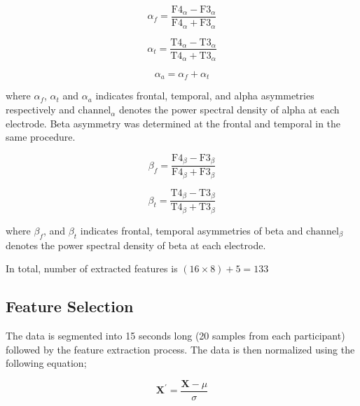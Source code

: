 \documentclass[pdflatex,sn-mathphys]{sn-jnl}%
\theoremstyle{thmstyleone}%
\theoremstyle{thmstyletwo}%
\theoremstyle{thmstylethree}%
\begin{document}
\begin{equation} \label{eq:3}
   \alpha_{f} =\frac{ \text{F4}_{\alpha} - \text{F3}_{\alpha} }{ \text{F4}_{\alpha} + \text{F3}_{\alpha} }
\end{equation}

\begin{equation} \label{eq:4}
    \alpha_{t} =\frac{ \text{T4}_{\alpha} - \text{T3}_{\alpha} }{ \text{T4}_{\alpha} + \text{T3}_{\alpha} }
\end{equation}

\begin{equation} \label{eq:5}
   \alpha_{a} ={\alpha_{f}+\alpha_{t}}
\end{equation}

where $\alpha_{f}$, $\alpha_{t}$ and $\alpha_{a}$ indicates frontal, temporal, and alpha asymmetries respectively and $\text{channel}_\alpha$ denotes the power spectral density of alpha at each electrode. Beta asymmetry was determined at the frontal and temporal in the same procedure.

\begin{equation} \label{eq:6}
    \beta_{f} =\frac{ \text{F4}_{\beta} - \text{F3}_{\beta} }{ \text{F4}_{\beta} + \text{F3}_{\beta} }
\end{equation}

\begin{equation} \label{eq:7}
    \beta_{t} =\frac{ \text{T4}_{\beta} - \text{T3}_{\beta} }{ \text{T4}_{\beta} + \text{T3}_{\beta} }
\end{equation}

where $\beta_{f}$, and $\beta_{t}$ indicates frontal, temporal asymmetries of beta and $\text{channel}_\beta$ denotes the power spectral density of beta at each electrode.

In total, number of extracted features is $(16 \times 8) + 5 = 133$

\subsection{Feature Selection}\label{sec:feature_selection}
The data is segmented into 15 seconds long (20 samples from each participant) followed by the feature extraction process. The data is then normalized using the following equation;

\begin{equation} \label{eq:normalized}
   \mathbf{X}^{\prime} = \frac{\mathbf{X} - \mu}{\sigma}
\end{equation}
\end{document}
